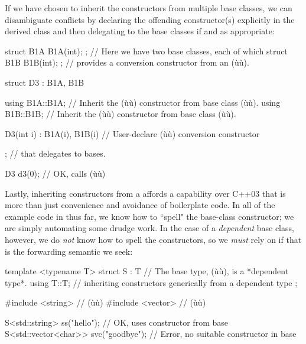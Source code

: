 If we have chosen to inherit the constructors from multiple
base classes, we can disambiguate conflicts by declaring the offending
constructor(s) explicitly in the derived class and then delegating to
the base classes if and as appropriate:

\begin{emcppslisting}
struct B1A { B1A(int); };  // Here we have two base classes, each of which
struct B1B { B1B(int); };  // provides a conversion constructor from an (ù{}ù).

struct D3 : B1A, B1B
{
    using B1A::B1A;  // Inherit the (ù{}ù) constructor from base class (ù{}ù).
    using B1B::B1B;  // Inherit the (ù{}ù) constructor from base class (ù{}ù).

    D3(int i) : B1A(i), B1B(i) { }  // User-declare (ù{}ù) conversion constructor
};                                  // that delegates to bases.

D3 d3(0);  // OK, calls (ù{}ù)
\end{emcppslisting}
    
\noindent Lastly, inheriting constructors from a  affords a capability over C++03 that is more than just convenience
and avoidance of boilerplate code.
  In all of the example code in  
  thus far, we know how to ``spell" the
base-class constructor; we are simply automating some drudge work. In
the case of a \emph{dependent} base class, however, we do \emph{not}
know how to spell the constructors, so we \emph{must} rely on
 if that is the forwarding semantic we
seek:

\begin{emcppslisting}
template <typename T>
struct S : T  // The base type, (ù{}ù), is a *dependent type*.
{
    using T::T;  // inheriting constructors generically from a dependent type
};

#include <string>   // (ù{}ù)
#include <vector>   // (ù{}ù)

S<std::string>        ss("hello");    // OK, uses constructor from base
S<std::vector<char>> svc("goodbye");  // Error, no suitable constructor in base
\end{emcppslisting}
    
